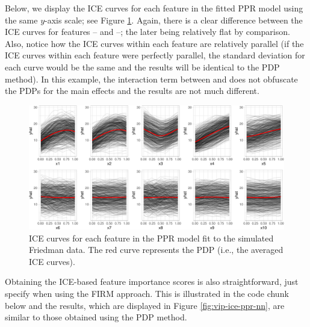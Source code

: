 Below, we display the ICE curves for each feature in the fitted PPR
model using the same \(y\)-axis scale; see Figure \ref{fig:ice-ppr}.
Again, there is a clear difference between the ICE curves for features
-- and --; the later being
relatively flat by comparison. Also, notice how the ICE curves within
each feature are relatively parallel (if the ICE curves within each
feature were perfectly parallel, the standard deviation for each curve
would be the same and the results will be identical to the PDP method).
In this example, the interaction term between  and 
does not obfuscate the PDPs for the main effects and the results are not
much different.

\begin{Schunk}
\begin{figure}[!htb]

{\centering \includegraphics[width=1\linewidth]{greenwell-boehmke_files/figure-latex/ice-ppr-1}

}

\caption[ICE curves for each feature in the PPR model fit to the simulated Friedman data]{ICE curves for each feature in the PPR model fit to the simulated Friedman data. The red curve represents the PDP (i.e., the averaged ICE curves).}\label{fig:ice-ppr}
\end{figure}
\end{Schunk}

Obtaining the ICE-based feature importance scores is also
straightforward, just specify  when using the FIRM
approach. This is illustrated in the code chunk below and the results,
which are displayed in Figure \ref{fig:vip-ice-ppr-nn}, are similar to
those obtained using the PDP method.

